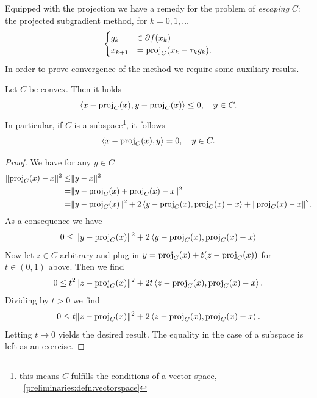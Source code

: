 Equipped with the projection we have a remedy for the problem of \emph{escaping} $C$: the projected subgradient method, for $k=0,1,\dots$
\begin{equation}\label{subgradient:eq:projectedSG}
    \begin{cases}
        g_k &\in \partial f(x_k)\\
        x_{k+1} &= \mathrm{proj}_C( x_k-\tau_k g_k) .
    \end{cases}
\end{equation}
In order to prove convergence of the method we require some auxiliary results.

\begin{lemma}
    Let $C$ be convex. Then it holds
    \begin{equation}
        \left\langle x-\mathrm{proj}_C(x) , y-\mathrm{proj}_C(x)\right\rangle\leq 0,\quad y\in C.
    \end{equation}
    In particular, if $C$ is a subspace\footnote{this means $C$ fulfills the conditions of a vector space, \cf~\cref{preliminaries:defn:vectorspace}}, it follows
    \begin{equation}
        \left\langle x-\mathrm{proj}_C(x) , y\right\rangle= 0,\quad y\in C.
    \end{equation}
\end{lemma}
\begin{proof}
    We have for any $y\in C$
    \begin{equation}
        \begin{aligned}
            \|\mathrm{proj}_C(x)-x\|^2\leq& \|y-x\|^2\\
            =& \|y - \mathrm{proj}_C(x) + \mathrm{proj}_C(x)-x\|^2\\
            =& \|y-\mathrm{proj}_C(x)\|^2 + 2 \left\langle y-\mathrm{proj}_C(x) , \mathrm{proj}_C(x)-x\right\rangle + \|\mathrm{proj}_C(x)-x\|^2.
        \end{aligned}
    \end{equation}
    As a consequence we have
    \begin{equation}
        \begin{aligned}
            0\leq \|y-\mathrm{proj}_C(x)\|^2 + 2 \left\langle y-\mathrm{proj}_C(x) , \mathrm{proj}_C(x)-x\right\rangle
        \end{aligned}
    \end{equation}
    Now let $z\in C$ arbitrary and plug in $y=\mathrm{proj}_C(x) + t(z-\mathrm{proj}_C(x))$ for $t\in (0,1)$ above. Then we find
    \begin{equation}
        \begin{aligned}
            0\leq t^2 \|z-\mathrm{proj}_C(x)\|^2 + 2 t\left\langle z-\mathrm{proj}_C(x) , \mathrm{proj}_C(x)-x\right\rangle.
        \end{aligned}
    \end{equation}
    Dividing by $t>0$ we find
    \begin{equation}
        \begin{aligned}
            0\leq t \|z-\mathrm{proj}_C(x)\|^2 + 2 \left\langle z-\mathrm{proj}_C(x) , \mathrm{proj}_C(x)-x\right\rangle.
        \end{aligned}
    \end{equation}
    Letting $t\rightarrow 0$ yields the desired result. The equality in the case of a subspace is left as an exercise.
\end{proof}


